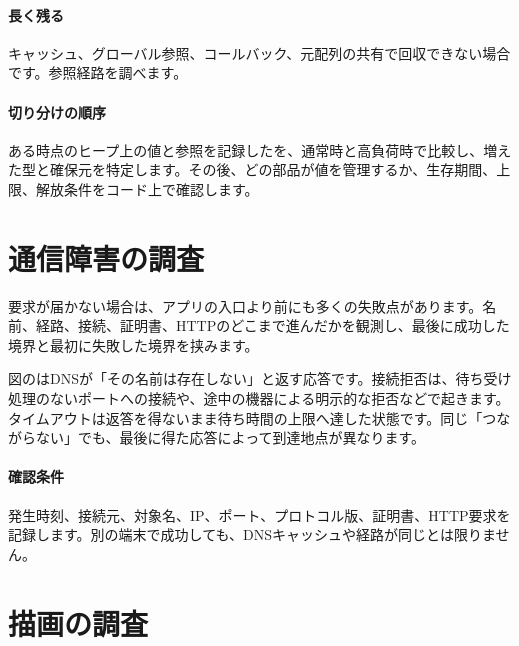 \par
\endgroup
\medskip
\begingroup
\paragraph{長く残る}
        キャッシュ、グローバル参照、コールバック、元配列の共有で回収できない場合です。参照経路を調べます。

\par
\endgroup
  \vspace{5mm}
\paragraph{切り分けの順序}
    ある時点のヒープ上の値と参照を記録したを、通常時と高負荷時で比較し、増えた型と確保元を特定します。その後、どの部品が値を管理するか、生存期間、上限、解放条件をコード上で確認します。

\par
\endgroup


\section{通信障害の調査}
\label{sec:07-practice-10}

要求が届かない場合は、アプリの入口より前にも多くの失敗点があります。名前、経路、接続、証明書、HTTPのどこまで進んだかを観測し、最後に成功した境界と最初に失敗した境界を挟みます。

図のはDNSが「その名前は存在しない」と返す応答です。接続拒否は、待ち受け処理のないポートへの接続や、途中の機器による明示的な拒否などで起きます。タイムアウトは返答を得ないまま待ち時間の上限へ達した状態です。同じ「つながらない」でも、最後に得た応答によって到達地点が異なります。

\begingroup
  \centering
  \vspace{5mm}
\paragraph{確認条件}
    発生時刻、接続元、対象名、IP、ポート、プロトコル版、証明書、HTTP要求を記録します。別の端末で成功しても、DNSキャッシュや経路が同じとは限りません。

\par
\endgroup

\section{描画の調査}

